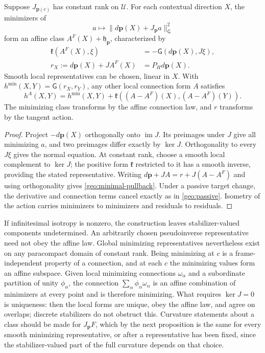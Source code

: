 Suppose $J_{\boldsymbol p(c)}$ has constant rank on $\mathcal U$. For each contextual direction $X$, the minimizers of
\begin{equation}
a\longmapsto\|d\boldsymbol p(X)+J_{\boldsymbol p}a\|_{\mathsf G}^2
\end{equation}
form an affine class $A^F(X)+\mathfrak h_{\boldsymbol p}$, characterized by
\begin{align}
\mathfrak k(A^F(X),\xi)
&=-\mathsf G(d\boldsymbol p(X),J\xi),\\
r_X:=d\boldsymbol p(X)+JA^F(X)
&=P_Hd\boldsymbol p(X).
\label{geo:normal-equation}
\end{align}
Smooth local representatives can be chosen, linear in $X$. With $h^{\min}(X,Y)=\mathsf G(r_X,r_Y)$, any other local connection form $A$ satisfies
\begin{equation}
h^A(X,Y)
=h^{\min}(X,Y)
+\mathfrak k((A-A^F)(X),(A-A^F)(Y)).
\label{geo:minimal-pullback}
\end{equation}
The minimizing class transforms by the affine connection law, and $r$ transforms by the tangent action.
\begin{proof}
Project $-d\boldsymbol p(X)$ orthogonally onto $\operatorname{im}J$. Its preimages under $J$ give all minimizing $a$, and two preimages differ exactly by $\ker J$. Orthogonality to every $J\xi$ gives the normal equation. At constant rank, choose a smooth local complement to $\ker J$; the positive form $\mathfrak k$ restricted to it has a smooth inverse, providing the stated representative. Writing $d\boldsymbol p+JA=r+J(A-A^F)$ and using orthogonality gives \cref{geo:minimal-pullback}. Under a passive target change, the derivative and connection terms cancel exactly as in \cref{geo:passive}. Isometry of the action carries minimizers to minimizers and residuals to residuals.
\end{proof}

If infinitesimal isotropy is nonzero, the construction leaves stabilizer-valued components undetermined. An arbitrarily chosen pseudoinverse representative need not obey the affine law. Global minimizing representatives nevertheless exist on any paracompact domain of constant rank. Being minimizing at $c$ is a frame-independent property of a connection, and at each $c$ the minimizing values form an affine subspace. Given local minimizing connections $\omega_\alpha$ and a subordinate partition of unity $\phi_\alpha$, the connection $\sum_\alpha\phi_\alpha\omega_\alpha$ is an affine combination of minimizers at every point and is therefore minimizing. What requires $\ker J=0$ is uniqueness: then the local forms are unique, obey the affine law, and agree on overlaps; discrete stabilizers do not obstruct this. Curvature statements about a class should be made for $J_{\boldsymbol p}F$, which by the next proposition is the same for every smooth minimizing representative, or after a representative has been fixed, since the stabilizer-valued part of the full curvature depends on that choice.

